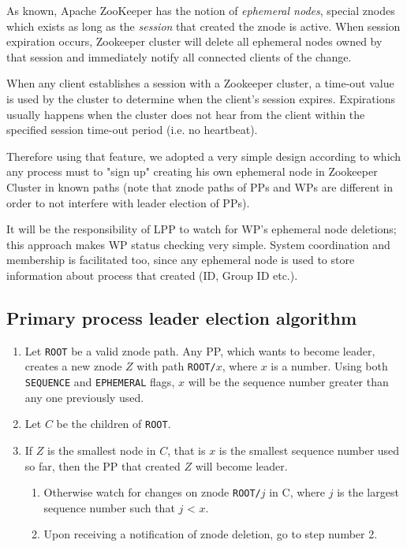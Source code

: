 \documentclass[sigchi]{acmart}
\begin{document}
As known, Apache ZooKeeper has the notion of \textit{ephemeral nodes}, special znodes which exists as long as the \textit{session} that created the znode is active. When session expiration occurs, Zookeeper cluster will delete all ephemeral nodes owned by that session and immediately notify all connected clients of the change.

When any client establishes a session with a Zookeeper cluster, a time-out value is used by the cluster to determine when the client's session expires. Expirations usually happens when the cluster does not hear from the client within the specified session time-out period (i.e. no heartbeat).

Therefore using that feature, we adopted a very simple design according to which any process must to "sign up" creating his own ephemeral node in Zookeeper Cluster in known paths (note that znode paths of PPs and WPs are different in order to not interfere with leader election of PPs). 

It will be the responsibility of LPP to watch for WP's ephemeral node deletions; this approach makes WP status checking very simple. System coordination and membership is facilitated too, since any ephemeral node is used to store information about process that created (ID, Group ID etc.).


\subsection{Primary process leader election algorithm}

\begin{algorithm}
\caption{}\label{alg:leaderElection}
\begin{enumerate}

\item Let \texttt{ROOT} be a valid znode path. Any PP, which wants to become leader, creates a new znode $Z$ with path \texttt{ROOT/$x$}, where $x$ is a number. Using both \texttt{SEQUENCE} and \texttt{EPHEMERAL} flags, $x$ will be the sequence number greater than any one previously used.

\item Let $C$ be the children of \texttt{ROOT}. 

\item If $Z$ is the smallest node in $C$, that is $x$ is the smallest sequence number used so far, then the PP that created $Z$ will become leader.

\begin{enumerate}

\item Otherwise watch for changes on znode \texttt{ROOT/$j$} in C, where $j$ is the largest sequence number such that $j$ < $x$.

\item Upon receiving a notification of znode deletion, go to step number 2. 

\end{enumerate}
\end{enumerate}
\end{algorithm}
\end{document}
